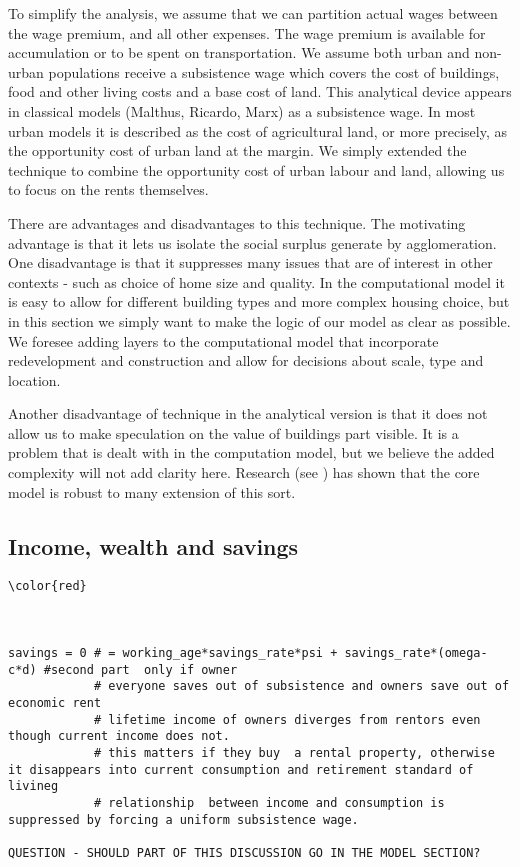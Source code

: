 To simplify the analysis, we assume that we can partition actual wages between the wage premium,  and all other expenses. The wage premium  is available for accumulation or to be spent on transportation. We assume both urban and non-urban populations  receive a \gls{subsistence wage} which covers  the cost of buildings, food and other living costs and a base cost of land. This analytical device appears in classical models (Malthus, Ricardo, Marx) as a subsistence wage. In most urban models it is described as the cost of agricultural land, or more precisely,  as the opportunity cost of urban land at the margin. We simply extended the technique to combine the opportunity cost of urban labour and land, allowing us to focus on the rents themselves. 


There are advantages and disadvantages to this technique. The motivating advantage is that it lets us isolate the social surplus generate by agglomeration. One disadvantage is that it suppresses many issues that are of interest in other contexts - such as choice of home size and quality. In the computational model it is easy to allow for different building types and more complex housing choice, but in this section we simply  want to make the logic of our model as clear as possible. We foresee adding layers to the computational model that incorporate redevelopment and construction and allow for decisions about scale, type and location. 

Another disadvantage of technique in the analytical version is that it does not allow us to make speculation on  the value of  buildings part visible. It is a problem that is dealt with in the computation model, but we believe the added complexity will not add clarity here. Research (see \cite{mcdonaldWilliamAlonsoRichard2007}) has shown  that the core model is robust to many extension of this sort. 

\subsection{Income, wealth and savings}
\begin{verbatim}\color{red}



savings = 0 # = working_age*savings_rate*psi + savings_rate*(omega-c*d) #second part  only if owner 
            # everyone saves out of subsistence and owners save out of economic rent 
            # lifetime income of owners diverges from rentors even though current income does not. 
            # this matters if they buy  a rental property, otherwise it disappears into current consumption and retirement standard of livineg
            # relationship  between income and consumption is suppressed by forcing a uniform subsistence wage.

QUESTION - SHOULD PART OF THIS DISCUSSION GO IN THE MODEL SECTION?
\end{verbatim}



